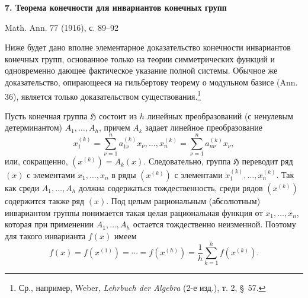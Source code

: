 \documentclass[11pt]{article}
\providecommand{\Hgrp}{\mathfrak{H}}
\begin{document}
\begin{center}
{\Large\bfseries 7. Теорема конечности для инвариантов конечных групп}\par
\vspace{1.2em}
Math. Ann. 77 (1916), с. 89--92
\end{center}

\vspace{1em}

Ниже будет дано вполне элементарное доказательство конечности инвариантов конечных групп, основанное только на теории симметрических функций и одновременно дающее фактическое указание полной системы. Обычное же доказательство, опирающееся на гильбертову теорему о модульном базисе (Ann. 36), является только доказательством существования.\footnote{Ср., например, Weber, \emph{Lehrbuch der Algebra} (2-е изд.), т. 2, \S\ 57.}

Пусть конечная группа $\Hgrp$ состоит из $h$ линейных преобразований (с ненулевым детерминантом) $A_1,\ldots,A_h$, причем $A_k$ задает линейное преобразование
\[
  x_1^{(k)}=\sum_{\nu=1}^{n}a_{1\nu}^{(k)}x_\nu,\ldots,
  x_n^{(k)}=\sum_{\nu=1}^{n}a_{n\nu}^{(k)}x_\nu,
\]
или, сокращенно, $(x^{(k)})=A_k(x)$. Следовательно, группа $\Hgrp$ переводит ряд $(x)$ с элементами $x_1,\ldots,x_n$ в ряды $(x^{(k)})$ с элементами $x_1^{(k)},\ldots,x_n^{(k)}$. Так как среди $A_1,\ldots,A_h$ должна содержаться тождественность, среди рядов $(x^{(k)})$ содержится также ряд $(x)$. Под целым рациональным (абсолютным) инвариантом группы понимается такая целая рациональная функция от $x_1,\ldots,x_n$, которая при применении $A_1,\ldots,A_h$ остается тождественно неизменной. Поэтому для такого инварианта $f(x)$ имеем
\begin{equation}
  f(x)=f(x^{(1)})=\cdots=f(x^{(h)})=
  \frac1h\sum_{k=1}^{h}f(x^{(k)}).
\tag{1}
\end{equation}
\end{document}
